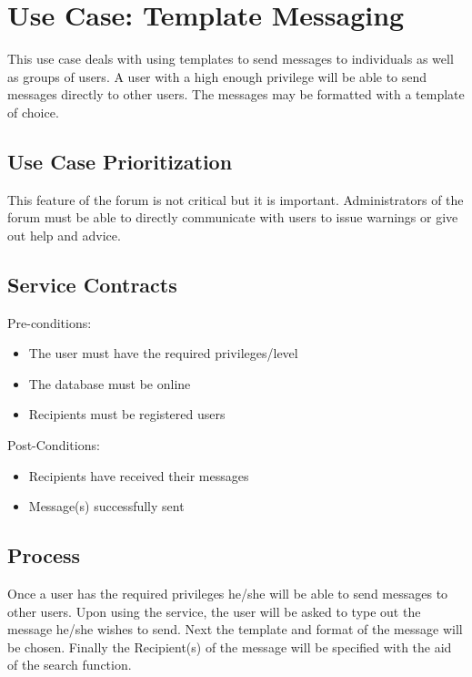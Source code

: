 \documentclass[a4paper,12pt]{article}
\begin{document}
\section{Use Case: Template Messaging}
This use case deals with using templates to send messages to individuals as well as groups of users. A user with a high enough privilege will be able to send messages directly to other users. The messages may be formatted with a template of choice.

\subsection{Use Case Prioritization}
This feature of the forum is not critical but it is important. Administrators of the forum must be able to directly communicate with users to issue warnings or give out help and advice.

\subsection{Service Contracts}
Pre-conditions: 
\begin{itemize}
\item The user must have the required privileges/level
\item The database must be online
\item Recipients must be registered users
\end{itemize}
      
Post-Conditions:
\begin{itemize}
\item Recipients have received their messages
\item Message(s) successfully sent
\end{itemize}
      
\subsection{Process}
Once a user has the required privileges he/she will be able to send messages to other users. Upon using the service, the user will be asked to type out the message he/she wishes to send. Next the template and format of the message will be chosen. Finally the Recipient(s) of the message will be specified with the aid of the search function. 
\end{document}
